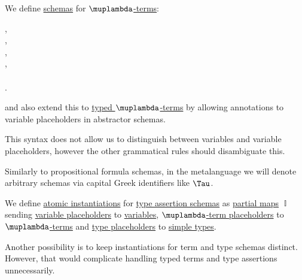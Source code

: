 \begin{definition}\label{def:lambda_term_schema}
  We define \hyperref[con:schemas_and_instances]{schemas} for \hyperref[def:lambda_term]{\( \muplambda \)-terms}:
  \begin{bnf*}
     {}, \\
         {}, \\
       {\bnftsq{\( ( \)} \bnfsp {} \bnfsp {} \bnfsp \bnftsq{\( ) \)}}, \\
       {\bnftsq{\( ( \)} \bnfsp \bnftsq{\( \synlambda \)} \bnfsp {} \bnfsp {} \bnfsp {} \bnfsp \bnftsq{\( ) \)}}, \\
              { \bnfor {} \bnfor {} \bnfor} \\
    .
  \end{bnf*}
  and also extend this to \hyperref[def:typed_lambda_term]{typed \( \muplambda \)-terms} by allowing annotations to variable placeholders in abstractor schemas.
\end{definition}
\begin{comments}
  \item This syntax does not allow us to distinguish between variables and variable placeholders, however the other grammatical rules should disambiguate this.

  \item Similarly to propositional formula schemas, in the metalanguage we will denote arbitrary schemas via capital Greek identifiers like \( \Tau \).
\end{comments}

\begin{definition}\label{def:atomic_lambda_instantiation}\mimprovised
  We define \hyperref[con:schemas_and_instances]{atomic instantiations} for \hyperref[def:simple_type_assertion_schema]{type assertion schemas} as \hyperref[def:partial_function]{partial maps} \( \BbbI \) sending \hyperref[def:lambda_term_schema]{variable placeholders} to \hyperref[def:lambda_term]{variables}, \hyperref[def:lambda_term_schema]{\( \muplambda \)-term placeholders} to \hyperref[def:lambda_term]{\( \muplambda \)-terms} and \hyperref[def:simple_type_schema]{type placeholders} to \hyperref[def:simple_type]{simple types}.
\end{definition}
\begin{comments}
  \item Another possibility is to keep instantiations for term and type schemas distinct. However, that would complicate handling typed terms and type assertions unnecessarily.
\end{comments}

